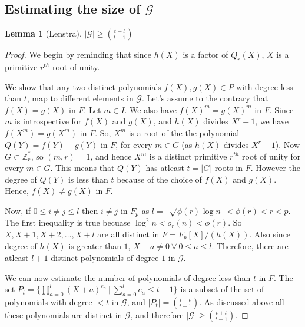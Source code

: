 \documentclass[11pt]{report}
\newtheorem{lemma}[theorem]{Lemma}
\begin{document}
\subsection{Estimating the size of $\mathcal{G}$}
\begin{lemma}
[Lenstra]\label{lemma:GLowerBound}
$|\mathcal{G}| \geq {{t+l} \choose {t-1}}$
\end{lemma}
\begin{proof}
We begin by reminding that since $h(X)$ is a factor of $Q_r(X)$, $X$ is a primitive $r^{th}$ root of unity.

We show that any two distinct polynomials $f(X), g(X) \in P$ with degree less than $t$, map to different elements in $\mathcal{G}$. Let's assume to the contrary that $f(X) = g(X)$ in $F$. Let $m \in I$. We also have $f(X)^m = g(X)^m$ in $F$. Since $m$ is introspective for $f(X)$ and $g(X)$, and $h(X)$ divides $X^r-1$, we have $f(X^m) = g(X^m)$ in $F$. So, $X^m$ is a root of the the polynomial $Q(Y) = f(Y) - g(Y)$ in $F$, for every $m \in G$ (as $h(X)$ divides $X^r-1$). Now $G \subset \mathbb{Z}_r^*$, so $(m,r) = 1$, and hence $X^m$ is a distinct primitive $r^{th}$ root of unity for every $m \in G$. This means that $Q(Y)$ has atleast $t = |G|$ roots in $F$. However the degree of $Q(Y)$ is less than $t$ because of the choice of $f(X)$ and $g(X)$. Hence, $f(X) \neq g(X)$ in $F$.

Now, if $0 \leq i \neq j \leq l$ then $i \neq j$ in $F_p$ as $l = \lfloor \sqrt{\phi(r)} \log n\rfloor < \phi(r) < r < p$. The first inequality is true becuase $\log^2{n} < o_r(n) < \phi(r)$. So $X, X+1, X+2, \dots, X+l$ are all distinct in $F = F_p[X]/(h(X))$. Also since degree of $h(X)$ is greater than $1$, $X+a \neq 0\ \forall \ 0 \leq a \leq l$. Therefore, there are atleast $l+1$ distinct polynomials of degree $1$ in $\mathcal{G}$.

We can now estimate the number of polynomials of degree less than $t$ in $F$. The set $P_t = \{\prod_{a=0}^{l}(X+a)^{e_a}\ | \ \sum_{a=0}^{l}e_a \leq t-1\}$ is a subset of the set of polynomials with degree $<t$ in $\mathcal{G}$, and $|P_t| = {{l+t}\choose{t-1}}$. As discussed above all these polynomials are distinct in $\mathcal{G}$, and therefore $|\mathcal{G}| \geq {{t+l} \choose {t-1}}$.
\end{proof}
\end{document}
